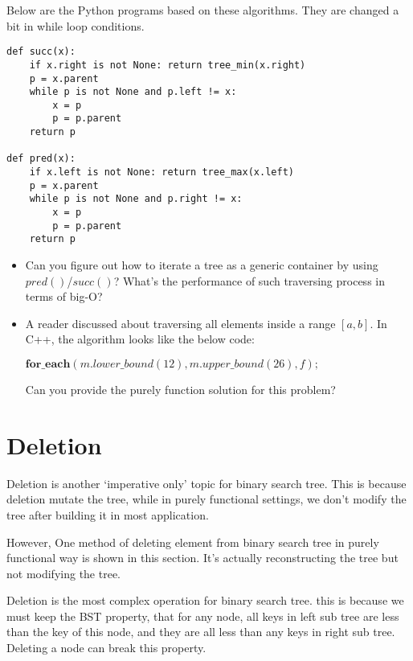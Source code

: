 \documentclass{article}
\begin{document}
Below are the Python programs based on these algorithms. They are changed
a bit in while loop conditions.

\lstset{language=Python}
\begin{lstlisting}
def succ(x):
    if x.right is not None: return tree_min(x.right)
    p = x.parent
    while p is not None and p.left != x:
        x = p
        p = p.parent
    return p

def pred(x):
    if x.left is not None: return tree_max(x.left)
    p = x.parent
    while p is not None and p.right != x:
        x = p
        p = p.parent
    return p
\end{lstlisting}

\begin{Exercise}

\begin{itemize}
\item Can you figure out how to iterate a tree as a generic container
by using $pred()$/$succ()$? What's the performance of such traversing
process in terms of big-O?

\item A reader discussed about traversing all elements inside a
range $[a, b]$. In C++, the algorithm looks like the below code:

$\mathbf{for\_each} (m.lower\_bound(12), m.upper\_bound(26), f);$

Can you provide the purely function solution for this problem?
\end{itemize}

\end{Exercise}

\section{Deletion}
Deletion is another `imperative only' topic for binary search tree.
This is because deletion mutate the tree, while in purely functional
settings, we don't modify the tree after building it in most
application.

However, One method of deleting element from binary search
tree in purely functional way is shown in this section. It's actually
reconstructing the tree but not modifying the tree.

Deletion is the most complex operation for binary search tree.
this is because we must keep the BST property, that for any node,
all keys in left sub tree are less than the key of this node, and
they are all less than any keys in right sub tree. Deleting a node
can break this property.
\end{document}
